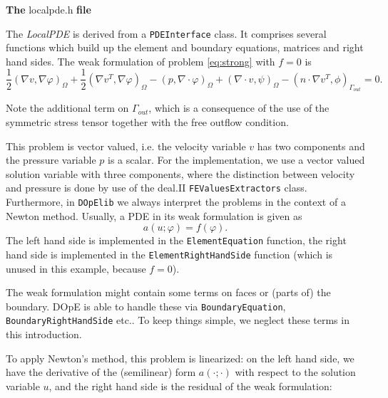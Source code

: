 \vspace{0.2cm}

\textbf{The} localpde.h \textbf{file}\\

\vspace{0.2cm}

The \textit{LocalPDE} is derived from a \texttt{PDEInterface} class. It comprises several functions which build up the element and boundary equations, matrices and right hand sides. The weak formulation of problem \eqref{eq:strong} with $f=0$ is
\begin{equation} \label{eq:weak}
   \frac{1}{2}(\nabla v, \nabla \varphi)_\Omega + \frac{1}{2}(\nabla v^{T}, \nabla \varphi)_\Omega - (p, \nabla \cdot \varphi)_\Omega + (\nabla \cdot v, \psi)_\Omega - (n\cdot \nabla v^T,\phi)_{\Gamma_{out}} = 0.
\end{equation}
\begin{remark}
Note the additional term on $\Gamma_{out}$, which is a consequence of the use of the symmetric stress tensor together with the free outflow condition.
\end{remark}
This problem is vector valued, i.e. the velocity variable $v$ has two components and the pressure variable $p$ is a scalar. For the implementation, we use a vector valued solution variable with three components, where the distinction between velocity and pressure is done by use of the deal.II \texttt{FEValuesExtractors} class. \\
Furthermore, in \texttt{DOpElib} we always interpret the problems in the context of a Newton method. Usually, a PDE in its weak formulation is given as
\begin{equation*}
   a(u;\varphi) = f(\varphi).
\end{equation*}
The left hand side is implemented in the \texttt{ElementEquation} function, the right hand side is implemented in the \texttt{ElementRightHandSide} function (which is unused in this example, because $f=0$).
\begin{remark}
The weak formulation might contain some terms on faces or (parts of) the boundary. DOpE is able to handle these via \texttt{BoundaryEquation}, \texttt{BoundaryRightHandSide} etc.. To keep things simple, we neglect these terms in this introduction.
\end{remark}
To apply Newton's method, this problem is linearized: on the left hand side, we have the derivative of the (semilinear) form $a(\cdot;\cdot)$ with respect to the solution variable $u$, and the right hand side is the residual of the weak formulation:

